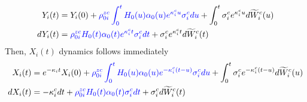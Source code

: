 \documentclass[]{article}
\begin{document}
%
\begin{align}
Y_i(t) &=Y_i(0)+ \textcolor{blue}{ \rho^{zc}_{0i } \int_{0}^t   H_0(u) \alpha_0(u) e^{\kappa^c_i u}  \sigma_i^c du }  + \int_0^t \sigma_i^c  e^{\kappa^c_i u} d\widetilde W_i^c(u)\nonumber \\
dY_i(t) &= \textcolor{blue}{ \rho^{zc}_{0i } H_0(t) \alpha_0(t) e^{\kappa^c_i t}  \sigma_i^c   dt} +  \sigma_i^c  e^{\kappa^c_i t} d\widetilde W_i^c(t)\nonumber 
\end{align}
%
Then, $X_i(t)$ dynamics follows immediately
%
\begin{align}
X_i(t) &=  e^{-\kappa_i t}X_i(0) + \textcolor{blue}{ \rho^{zc}_{0i } \int_{0}^t   H_0(u) \alpha_0(u)e^{-\kappa^c_i (t-u)}  \sigma_i^c du}  + \int_0^t \sigma_i^c  e^{-\kappa^c_i (t-u)} d\widetilde W_i^c(u)\nonumber \\
dX_i(t) &= -\kappa^c_i dt  + \textcolor{blue}{ \rho^{zc}_{0i } H_0(t) \alpha_0(t)  \sigma_i^c  dt}  +  \sigma_i^c  d\widetilde W_i^c(t)\nonumber 
\end{align}
\end{document}
